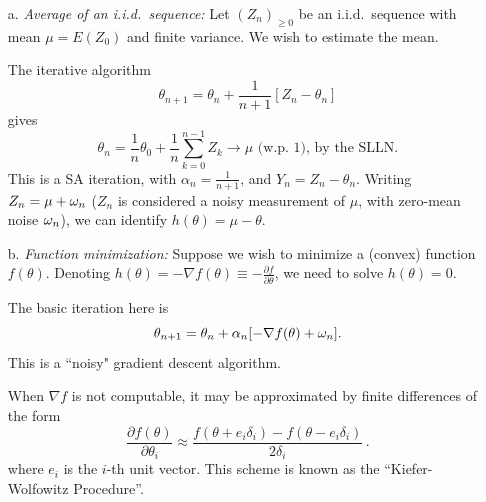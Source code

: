 \begin{itemize}
\item[a.]
{\em Average of an i.i.d.\ sequence:}
Let $(Z_n)_{\ge 0}$ be an i.i.d.\  sequence with mean $\mu = E(Z_0)$ and
finite variance.  We wish to estimate the mean.

The iterative algorithm
$$
\theta_{n+1} = \theta_n + \frac{1}{n+1} [Z_n - \theta_n]
$$
gives
$$
\theta_n = \frac{1}{n} \theta_0 + \frac{1}{n} \sum_{k=0}^{n-1} Z_k \to
\mu \text{\ \ (w.p.~1),\ \ \ by the SLLN} .
$$
This is a SA iteration, with $\alpha_n=\frac{1}{n+1}$, and
$Y_n = Z_n - \theta_n$.
Writing $Z_n=\mu+\omega_n$ ($Z_n$ is considered a noisy measurement of $\mu$,
with zero-mean noise $\omega_n$), we can identify
$h(\theta) = \mu - \theta$.

\item[b.]
{\em Function minimization:} Suppose we wish to minimize a (convex) function $f(\theta)$.
Denoting $h(\theta) = - \nabla f(\theta) \equiv -\frac{\partial f}{\partial
\theta}$, we need to solve $h(\theta) = 0$.

The basic iteration here is
$$
\theta_{n+1} = \theta_n + \alpha_n [-\nabla f (\theta) + \omega_n].
$$
This is a ``noisy" gradient descent algorithm.

When $\nabla f$ is not computable, it may be approximated by finite
differences of the form
$$
\frac{\partial f(\theta)}{\partial \theta_i} \approx
\frac{f(\theta+ e_i\delta_i) - f(\theta-e_i\delta_i)}{2\delta_i}\,.
$$
where $e_i$ is the $i$-th unit vector.
This scheme is known as the ``Kiefer-Wolfowitz Procedure''.
\end{itemize}

